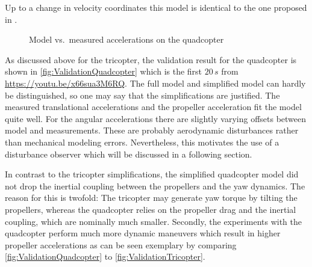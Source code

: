 Up to a change in velocity coordinates this model is identical to the one proposed in \cite[eq.\ 7--12]{Mahony:Quadrotor2002}.

\begin{figure}[p]
 \centering
 \footnotesize%
 
 \vspace{-20pt}
 \caption{Model vs.\ measured accelerations on the quadcopter}
 \label{fig:ValidationQuadcopter}
\end{figure}

As discussed above for the tricopter, the validation result for the quadcopter is shown in \autoref{fig:ValidationQuadcopter} which is the first $20\,\unit{s}$ from \url{https://youtu.be/x66sua3M6RQ}.
The full model and simplified model can hardly be distinguished, so one may say that the simplifications are justified.
The measured translational accelerations and the propeller acceleration fit the model quite well.
For the angular accelerations there are slightly varying offsets between model and measurements.
These are probably aerodynamic disturbances rather than mechanical modeling errors.
Nevertheless, this motivates the use of a disturbance observer which will be discussed in a following section.

In contrast to the tricopter simplifications, the simplified quadcopter model did not drop the inertial coupling between the propellers and the yaw dynamics.
The reason for this is twofold:
The tricopter may generate yaw torque by tilting the propellers, whereas the quadcopter relies on the propeller drag and the inertial coupling, which are nominally much smaller.
Secondly, the experiments with the quadcopter perform much more dynamic maneuvers which result in higher propeller accelerations as can be seen exemplary by comparing \autoref{fig:ValidationQuadcopter} to \autoref{fig:ValidationTricopter}.
